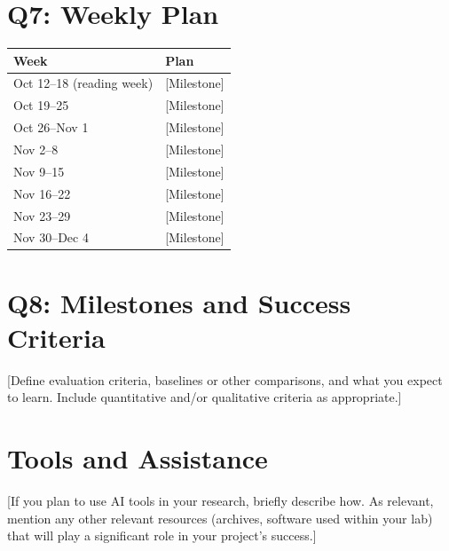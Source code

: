 \documentclass[11pt, letterpaper]{article}
\begin{document}
\newpage
\section*{Q7: Weekly Plan}
\begin{center}
\renewcommand{\arraystretch}{1.2}
\begin{tabular}{lp{4.3in}}
\toprule
\textbf{Week} & \textbf{Plan} \\
\midrule
Oct 12--18 (reading week) & [Milestone] \\
Oct 19--25 & [Milestone] \\
Oct 26--Nov 1 & [Milestone] \\
Nov 2--8 & [Milestone] \\
Nov 9--15 & [Milestone] \\
Nov 16--22 & [Milestone] \\
Nov 23--29 & [Milestone] \\
Nov 30--Dec 4 & [Milestone] \\
\bottomrule
\end{tabular}
\end{center}

\section*{Q8: Milestones and Success Criteria}
[Define evaluation criteria, baselines or other comparisons, and what you expect
to learn. Include quantitative and/or qualitative criteria as appropriate.]

\section*{Tools and Assistance}
[If you plan to use AI tools in your research, briefly describe how. As relevant, mention any other relevant resources (archives, software used within your lab) that will play a significant role in your project's success.]



\end{document}
